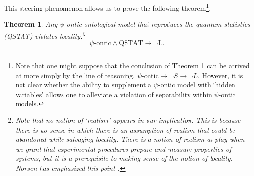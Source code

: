 \documentclass[aps,nofootinbib,12pt]{revtex4-2}
\newtheorem{theorem}{Theorem}
\begin{document}
This steering phenomenon allows us to prove the following
theorem\footnote{Note that one might suppose that the conclusion of
Theorem \ref{THRM:psi_ont_nonlocal} can be arrived at more simply by
the line of reasoning,
$\psi$-ontic$\rightarrow\lnot{S}\rightarrow\lnot{L}$. However, it is
not clear whether the ability to supplement a $\psi$-ontic model
with `hidden variables' allows one to alleviate a violation of
separability within $\psi$-ontic models.}.
\begin{theorem}
Any $\psi$-ontic ontological model that reproduces the quantum
statistics (QSTAT) violates locality,\footnote{Note that no notion
of `realism' appears in our implication.  This is because there is
no sense in which there is an assumption of realism that could be
abandoned while salvaging locality.  There \emph{is} a notion of
realism at play when we grant that experimental procedures prepare
and measure properties of systems, but it is a \emph{prerequisite}
to making sense of the notion of locality. Norsen has emphasized
this point \cite{norsen_blrealism,norsen_againstrealism}.}
\[
\psi\text{-ontic}\wedge\text{QSTAT}\rightarrow\lnot\text{L.}
\]
\label{THRM:psi_ont_nonlocal}
\end{theorem}
\end{document}
